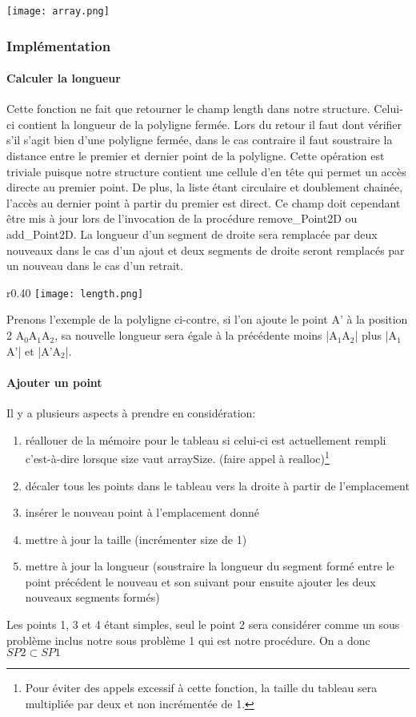 \documentclass[a4paper, 11pt, oneside]{article}
\begin{document}
\texttt{[image: array.png]}

\subsubsection{Implémentation}

\paragraph{Calculer la longueur} \label{length}

Cette fonction ne fait que retourner le champ length dans notre structure. Celui-ci contient la longueur de la polyligne fermée. Lors du retour il faut dont vérifier s'il s'agit bien d'une polyligne fermée, dans le cas contraire il faut soustraire la distance entre le premier et dernier point de la polyligne. Cette opération est triviale puisque notre structure contient une cellule d'en tête qui permet un accès directe au premier point. De plus, la liste étant circulaire et doublement chainée, l'accès au dernier point à partir du premier est direct.
Ce champ doit cependant être mis à jour lors de l'invocation de la procédure remove\_Point2D ou add\_Point2D. La longueur d'un segment de droite sera remplacée par deux nouveaux dans le cas d'un ajout et deux segments de droite seront remplacés par un nouveau dans le cas d'un retrait.
\begin{wrapfigure}{r}{0.40\textwidth}
    \centering
    \texttt{[image: length.png]}
\end{wrapfigure}
Prenons l'exemple de la polyligne ci-contre, si l'on ajoute le point A' à la position 2 A$_0$A$_1$A$_2$, sa nouvelle longueur sera égale à la précédente moins |A$_1$A$_2$| plus |A$_1$A'| et |A'A$_2$|.

\paragraph{Ajouter un point}

Il y a plusieurs aspects à prendre en considération:
\begin{enumerate}
    \item réallouer de la mémoire pour le tableau si celui-ci est actuellement rempli c'est-à-dire lorsque size vaut arraySize. (faire appel à realloc)\footnote{Pour éviter des appels excessif à cette fonction, la taille du tableau sera multipliée par deux et non incrémentée de 1.}
    \item décaler tous les points dans le tableau vers la droite à partir de l'emplacement
    \item insérer le nouveau point à l'emplacement donné
    \item mettre à jour la taille (incrémenter size de 1)
    \item mettre à jour la longueur (soustraire la longueur du segment formé entre le point précédent le nouveau et son suivant pour ensuite ajouter les deux nouveaux segments formés)
\end{enumerate}
Les points 1, 3 et 4 étant simples, seul le point 2 sera considérer comme un sous problème inclus notre sous problème 1 qui est notre procédure. On a donc $SP2 \subset SP1$
\end{document}
